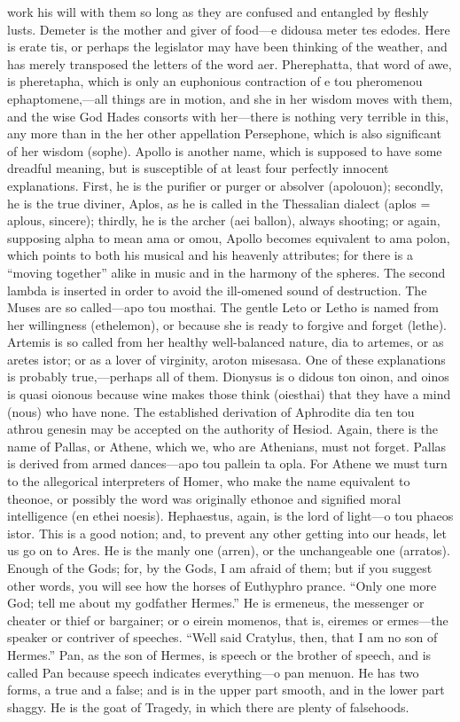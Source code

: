 \documentclass[11pt,letter]{article}
\begin{document}
work his will with them so long as they are confused and entangled by fleshly lusts. Demeter is the mother and giver of food—e didousa meter tes edodes. Here is erate tis, or perhaps the legislator may have been thinking of the weather, and has merely transposed the letters of the word aer. Pherephatta, that word of awe, is pheretapha, which is only an euphonious contraction of e tou pheromenou ephaptomene,—all things are in motion, and she in her wisdom moves with them, and the wise God Hades consorts with her—there is nothing very terrible in this, any more than in the her other appellation Persephone, which is also significant of her wisdom (sophe). Apollo is another name, which is supposed to have some dreadful meaning, but is susceptible of at least four perfectly innocent explanations. First, he is the purifier or purger or absolver (apolouon); secondly, he is the true diviner, Aplos, as he is called in the Thessalian dialect (aplos = aplous, sincere); thirdly, he is the archer (aei ballon), always shooting; or again, supposing alpha to mean ama or omou, Apollo becomes equivalent to ama polon, which points to both his musical and his heavenly attributes; for there is a “moving together” alike in music and in the harmony of the spheres. The second lambda is inserted in order to avoid the ill-omened sound of destruction. The Muses are so called—apo tou mosthai. The gentle Leto or Letho is named from her willingness (ethelemon), or because she is ready to forgive and forget (lethe). Artemis is so called from her healthy well-balanced nature, dia to artemes, or as aretes istor; or as a lover of virginity, aroton misesasa. One of these explanations is probably true,—perhaps all of them. Dionysus is o didous ton oinon, and oinos is quasi oionous because wine makes those think (oiesthai) that they have a mind (nous) who have none. The established derivation of Aphrodite dia ten tou athrou genesin may be accepted on the authority of Hesiod. Again, there is the name of Pallas, or Athene, which we, who are Athenians, must not forget. Pallas is derived from armed dances—apo tou pallein ta opla. For Athene we must turn to the allegorical interpreters of Homer, who make the name equivalent to theonoe, or possibly the word was originally ethonoe and signified moral intelligence (en ethei noesis). Hephaestus, again, is the lord of light—o tou phaeos istor. This is a good notion; and, to prevent any other getting into our heads, let us go on to Ares. He is the manly one (arren), or the unchangeable one (arratos). Enough of the Gods; for, by the Gods, I am afraid of them; but if you suggest other words, you will see how the horses of Euthyphro prance. “Only one more God; tell me about my godfather Hermes.” He is ermeneus, the messenger or cheater or thief or bargainer; or o eirein momenos, that is, eiremes or ermes—the speaker or contriver of speeches. “Well said Cratylus, then, that I am no son of Hermes.” Pan, as the son of Hermes, is speech or the brother of speech, and is called Pan because speech indicates everything—o pan menuon. He has two forms, a true and a false; and is in the upper part smooth, and in the lower part shaggy. He is the goat of Tragedy, in which there are plenty of falsehoods.
\end{document}

